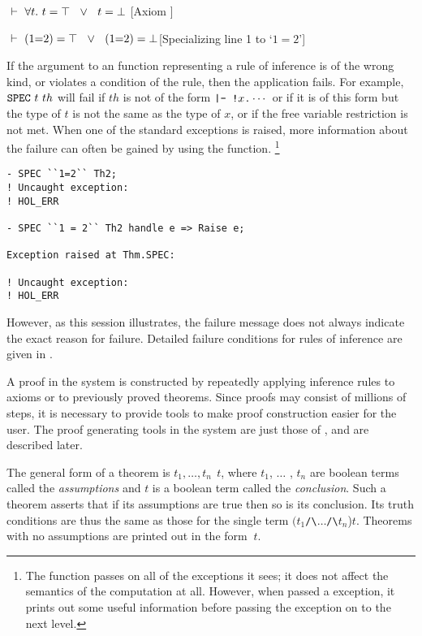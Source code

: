 \begin{proofenumerate}
\item $ \turn \uquant{t} t=\top\ \disj\  t=\bot$ \hfill
[Axiom ]
\item $ \turn (1{=}2)=\top\ \disj\ (1{=}2)=\bot$\hfill [Specializing line 1 to `$1{=}2$']
\end{proofenumerate}

If the argument to an \ML{} function representing a rule of inference
is of the wrong kind, or violates a condition of the rule, then the
application fails.  For example, $\ml{SPEC}\ t\ th$ will fail if $th$
is not of the form $\ml{|-\ !}x\ml{.}\cdots$ or if it is of this form
but the type of $t$ is not the same as the type of $x$, or if the free
variable restriction is not met.  When one of the standard
 exceptions is raised, more information about the failure
can often be gained by using the  function.
\footnote{The  function passes on all of the exceptions it
sees; it does not affect the semantics of the computation at all.
However, when passed a  exception, it prints out some
useful information before passing the exception on to the next level.}

\begin{session}
\begin{verbatim}
- SPEC ``1=2`` Th2;
! Uncaught exception:
! HOL_ERR

- SPEC ``1 = 2`` Th2 handle e => Raise e;

Exception raised at Thm.SPEC:

! Uncaught exception:
! HOL_ERR\end{verbatim}
\end{session}
However, as this session illustrates, the failure message does not
always indicate the exact reason for failure. Detailed failure conditions
for rules of inference are given in \REFERENCE.

A proof in the \HOL{} system is constructed by repeatedly applying
inference rules to axioms or to previously proved theorems.  Since
proofs may consist of millions of steps, it is necessary to provide
tools to make proof construction easier for the user.  The proof
generating tools in the \HOL{} system are just those of \LCF, and are
described later.

The general form of a theorem is $t_1,\ldots,t_n\ $\ml{|-}$\ t$, where
$t_1$, $\ldots$ , $t_n$ are boolean terms called the {\it assumptions}
and $t$ is a boolean term called the {\it conclusion\/}.  Such a
theorem asserts that if its assumptions are true then so is its
conclusion.  Its truth conditions are thus the same as those for the
single term
$(t_1${\small\verb|/\|}$\ldots${\small\verb|/\|}$t_n$)\ml{==>}$t$.
Theorems with no assumptions are printed out in the form \ml{|-}$\ t$.


